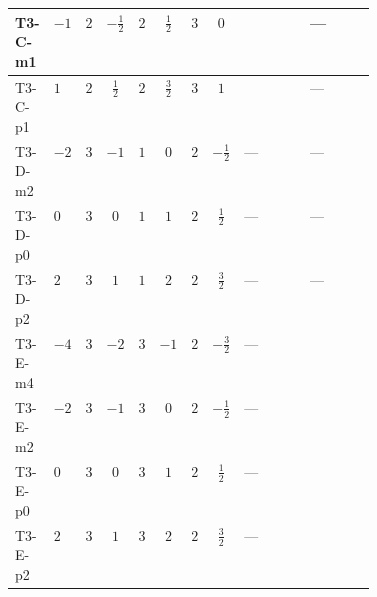 \documentclass[8pt]{article}
\begin{document}
\begin{landscape}
\begin{longtable}{@{}llcccccc >{\raggedright\arraybackslash}p{0.21\linewidth} >{\raggedright\arraybackslash}p{0.21\linewidth}@{}}
\midrule
T3-C-m1 & $-1$ & $2$ & $-\frac{1}{2}$ & $2$ & $\frac{1}{2}$ & $3$ & $0$ & \scriptsize\adjustbox{max width=\linewidth}{$\begin{gathered} {\lambda_{HS_2}^{(A)}} (3 T_{\nu}^{(2)}+6 \operatorname{Tr}\!\left({Y_d}\,\left({Y_d}\right)^{\dagger}\right)+2 \operatorname{Tr}\!\left({Y_e}\,\left({Y_e}\right)^{\dagger}\right)+6 \operatorname{Tr}\!\left({Y_u}\,\left({Y_u}\right)^{\dagger}\right))\end{gathered}$} & --- \\
\midrule
T3-C-p1 & $1$ & $2$ & $\frac{1}{2}$ & $2$ & $\frac{3}{2}$ & $3$ & $1$ & \scriptsize\adjustbox{max width=\linewidth}{$\begin{gathered} {\lambda_{HS_2}^{(A)}} (3 T_{\nu}^{(2)}+6 \operatorname{Tr}\!\left({Y_d}\,\left({Y_d}\right)^{\dagger}\right)+2 \operatorname{Tr}\!\left({Y_e}\,\left({Y_e}\right)^{\dagger}\right)+6 \operatorname{Tr}\!\left({Y_u}\,\left({Y_u}\right)^{\dagger}\right))\end{gathered}$} & --- \\
\midrule
T3-D-m2 & $-2$ & $3$ & $-1$ & $1$ & $0$ & $2$ & $-\frac{1}{2}$ & --- & --- \\
\midrule
T3-D-p0 & $0$ & $3$ & $0$ & $1$ & $1$ & $2$ & $\frac{1}{2}$ & --- & --- \\
\midrule
T3-D-p2 & $2$ & $3$ & $1$ & $1$ & $2$ & $2$ & $\frac{3}{2}$ & --- & --- \\
\midrule
T3-E-m4 & $-4$ & $3$ & $-2$ & $3$ & $-1$ & $2$ & $-\frac{3}{2}$ & --- & \scriptsize\adjustbox{max width=\linewidth}{$\begin{gathered} +12 {\lambda_{12}^{(A)}} {\lambda_{HS_1}^{(A)}}\end{gathered}$} \\
\midrule
T3-E-m2 & $-2$ & $3$ & $-1$ & $3$ & $0$ & $2$ & $-\frac{1}{2}$ & --- & \scriptsize\adjustbox{max width=\linewidth}{$\begin{gathered} +12 {\lambda_{12}^{(A)}} {\lambda_{HS_1}^{(A)}}\end{gathered}$} \\
\midrule
T3-E-p0 & $0$ & $3$ & $0$ & $3$ & $1$ & $2$ & $\frac{1}{2}$ & --- & \scriptsize\adjustbox{max width=\linewidth}{$\begin{gathered} +12 {\lambda_{12}^{(A)}} {\lambda_{HS_1}^{(A)}}\end{gathered}$} \\
\midrule
T3-E-p2 & $2$ & $3$ & $1$ & $3$ & $2$ & $2$ & $\frac{3}{2}$ & --- & \scriptsize\adjustbox{max width=\linewidth}{$\begin{gathered} +12 {\lambda_{12}^{(A)}} {\lambda_{HS_1}^{(A)}}\end{gathered}$} \\
\midrule
\bottomrule
\end{longtable}
\clearpage

\end{landscape}
\end{document}
